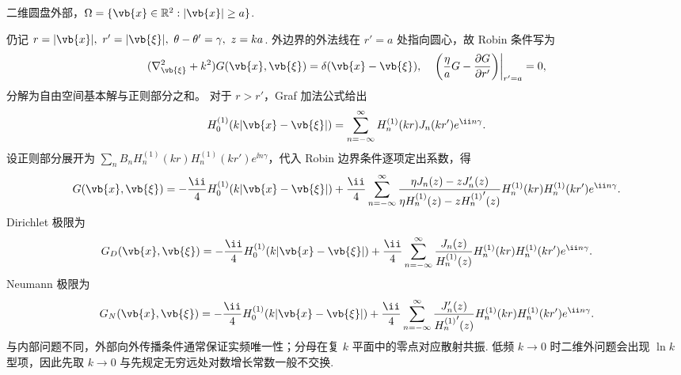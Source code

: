 \begin{exbox}
	二维圆盘外部，\(\Omega=\{\vb{x}\in\mathbb{R}^2:|\vb{x}|\geq a\}\).
	
	仍记 \(r=|\vb{x}|,\ r'=|\vb{\xi}|,\ \theta-\theta'=\gamma,\ z=ka\). 外边界的外法线在 \(r'=a\) 处指向圆心，故 Robin 条件写为
	\begin{align*}
		(\nabla_{\vb{\xi}}^2+k^2)G(\vb{x},\vb{\xi})=\delta(\vb{x}-\vb{\xi}),
		\quad
		\left.\left(\frac{\eta}{a}G-\frac{\partial G}{\partial r'}\right)\right|_{r'=a}=0,
	\end{align*}
	分解为自由空间基本解与正则部分之和。
	对于 \(r>r'\)，Graf 加法公式给出
	\begin{align*}
		H_0^{(1)}(k|\vb{x}-\vb{\xi}|)=\sum_{n=-\infty}^{\infty}H_n^{(1)}(kr)J_n(kr')e^{\ii n\gamma}.
	\end{align*}
	设正则部分展开为 \(\sum_{n}B_nH_n^{(1)}(kr)H_n^{(1)}(kr')e^{\ii n\gamma}\)，代入 Robin 边界条件逐项定出系数，得
	\begin{align*}
		G(\vb{x},\vb{\xi})=-\frac{\ii}{4}H_0^{(1)}(k|\vb{x}-\vb{\xi}|)
		+\frac{\ii}{4}\sum_{n=-\infty}^{\infty}
		\frac{\eta J_n(z)-zJ_n'(z)}{\eta H_n^{(1)}(z)-z{H_n^{(1)}}'(z)}
		H_n^{(1)}(kr)H_n^{(1)}(kr')e^{\ii n\gamma}.
	\end{align*}
	Dirichlet 极限为
	\begin{align*}
		G_D(\vb{x},\vb{\xi})=-\frac{\ii}{4}H_0^{(1)}(k|\vb{x}-\vb{\xi}|)
		+\frac{\ii}{4}\sum_{n=-\infty}^{\infty}
		\frac{J_n(z)}{H_n^{(1)}(z)}H_n^{(1)}(kr)H_n^{(1)}(kr')e^{\ii n\gamma}.
	\end{align*}
	Neumann 极限为
	\begin{align*}
		G_N(\vb{x},\vb{\xi})=-\frac{\ii}{4}H_0^{(1)}(k|\vb{x}-\vb{\xi}|)
		+\frac{\ii}{4}\sum_{n=-\infty}^{\infty}
		\frac{J_n'(z)}{{H_n^{(1)}}'(z)}H_n^{(1)}(kr)H_n^{(1)}(kr')e^{\ii n\gamma}.
	\end{align*}
	与内部问题不同，外部向外传播条件通常保证实频唯一性；分母在复 \(k\) 平面中的零点对应散射共振. 低频 \(k\to0\) 时二维外问题会出现 \(\ln k\) 型项，因此先取 \(k\to0\) 与先规定无穷远处对数增长常数一般不交换.
\end{exbox}

